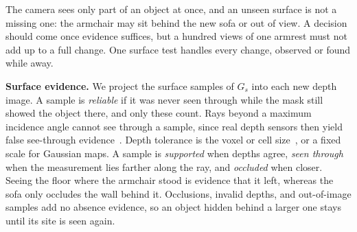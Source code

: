 \documentclass[10pt,twocolumn,letterpaper]{article}
\begin{document}
The camera sees only part of an object at once, and an unseen surface is not a missing one: the armchair may sit behind
the new sofa or out of view. A decision should come once evidence suffices, but a hundred views of one armrest must not
add up to a full change. One surface test handles every change, observed or found while away.

\vspace{0mm}\noindent\textbf{Surface evidence.}
We project the surface samples of $G_s$ into each new depth image. A sample is \emph{reliable} if it was never seen through while the mask still showed the object there, and only these count. Rays beyond a maximum incidence angle cannot see through a sample, since real depth sensors then yield false see-through evidence~\cite{6375037}. Depth tolerance is the voxel or cell
size~\cite{9811877}, or a fixed scale for Gaussian maps. A sample is \emph{supported} when depths agree,
\emph{seen through} when the measurement lies farther along the ray, and \emph{occluded} when closer. Seeing
the floor where the armchair stood is evidence that it left, whereas the sofa only occludes the wall behind it. Occlusions, invalid depths, and out-of-image samples add no absence evidence, so an object hidden behind a larger one stays until its site is seen again.
\end{document}
